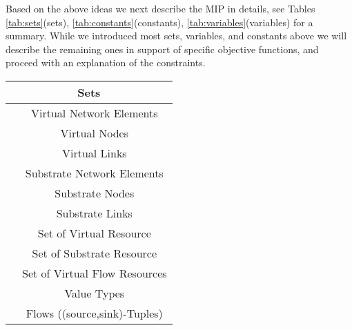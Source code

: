 \documentclass[conference,10pt]{IEEEtran}
\begin{document}
Based on the above ideas we next describe the MIP in details, see
Tables \ref{tab:sets}(sets), \ref{tab:constants}(constants), \ref{tab:variables}(variables) for a summary.
While we introduced most sets, variables, and constants above we will describe the remaining ones in support of specific objective functions, and proceed with an explanation of the constraints.

\begin{table*} [th]
\begin{center}
\begin{scriptsize}
\begin{tabular}{ | c | c |}
\hline
\multicolumn{2}{|c|}{Sets} \\
\hline
   & Virtual Network Elements\\
   & Virtual Nodes\\
   & Virtual Links\\
   & Substrate Network Elements\\
   & Substrate Nodes\\
   & Substrate Links\\
   & Set of Virtual Resource\\
   & Set of Substrate Resource\\
   & Set of Virtual Flow Resources\\
   & Value Types\\
   & Flows ((source,sink)-Tuples)\\
  \hline
\end{tabular}\label{sets}
\end{scriptsize}
\end{center}
\caption{Set definitions\label{tab:sets}}
\end{table*}
\end{document}
